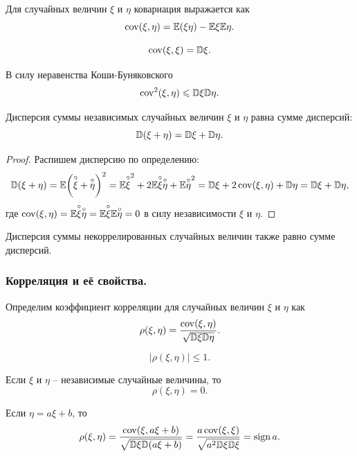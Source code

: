\begin{property}
    Для случайных величин $\xi$ и $\eta$ ковариация выражается как
    \[
        \operatorname{cov}(\xi, \eta) = \mathbb{E}(\xi\eta) - \mathbb{E}\xi\mathbb{E}\eta.
    \]  
\end{property}
\begin{property}
    \[
        \operatorname{cov}(\xi, \xi) = \mathbb{D}\xi.
    \]
\end{property}
\begin{property}
    В силу неравенства Коши-Буняковского
    \[
        \operatorname{cov}^2(\xi, \eta) \leqslant \mathbb{D}\xi\mathbb{D}\eta.
    \]
\end{property}
\begin{property}
    Дисперсия суммы независимых случайных величин $\xi$ и $\eta$ равна сумме дисперсий:
    \[
        \mathbb{D}(\xi + \eta) = \mathbb{D} \xi + \mathbb{D} \eta.
    \]
\end{property}
\begin{proof}
    Распишем дисперсию по определению:
    \[
        \mathbb{D}(\xi + \eta) = \mathbb{E}\biggr(\overset{\circ}{\xi} + \overset{\circ}{\eta}\biggr)^2 = \mathbb{E} \overset{\circ}{\xi}^2  + 2\mathbb{E} \overset{\circ}{\xi}\overset{\circ}{\eta} + \mathbb{E}\overset{\circ}{\eta}^2 = \mathbb{D} \xi + 2 \operatorname{cov}(\xi, \eta) + \mathbb{D} \eta = \mathbb{D} \xi + \mathbb{D} \eta,
    \]
    где $\operatorname{cov}(\xi, \eta) = \mathbb{E} \overset{\circ}{\xi}\overset{\circ}{\eta} = \mathbb{E} \overset{\circ}{\xi}\mathbb{E} \overset{\circ}{\eta} = 0$ в силу независимости $\xi$ и $\eta$.
\end{proof}
\begin{property}
    Дисперсия суммы некоррелированных случайных величин также равно сумме дисперсий.
\end{property}
\subsubsection{Корреляция и её свойства.}
\begin{definition}
    Определим коэффициент корреляции для случайных величин $\xi$ и $\eta$ как 
    \[
        \rho(\xi, \eta) = \dfrac{\operatorname{cov}(\xi, \eta)}{\sqrt{\mathbb{D} \xi \mathbb{D}\eta}}.
    \]
\end{definition}
\begin{property}
    \[
    |\rho(\xi, \eta)| \leq 1.
    \]
\end{property}
\begin{property}
    Если $\xi$ и $\eta$ -- независимые случайные величины, то
    \[
        \rho(\xi, \eta) = 0.
    \]
\end{property}
\begin{property}
    Если $\eta = a \xi + b$, то
    \[
        \rho(\xi, \eta) = \dfrac{\operatorname{cov}(\xi, a \xi + b)}{\sqrt{\mathbb{D}\xi \mathbb{D}(a\xi + b)}} = \dfrac{a\operatorname{cov}(\xi, \xi)}{\sqrt{a^2\mathbb{D} \xi \mathbb{D} \xi}} = \operatorname{sign} a.
    \]
\end{property}
